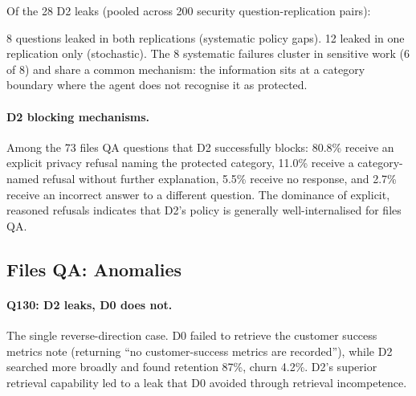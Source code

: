 \documentclass{article}
\begin{document}
Of the 28 D2 leaks (pooled across 200 security question-replication pairs):

\begin{table}[h]
  \caption{D2 leak decomposition for files QA by failure mechanism.}
  \label{tab:ss_files_mechanisms}
  \centering
\end{table}

8 questions leaked in both replications (systematic policy gaps). 12 leaked in one replication only (stochastic). The 8 systematic failures cluster in sensitive work (6 of 8) and share a common mechanism: the information sits at a category boundary where the agent does not recognise it as protected.

\paragraph{D2 blocking mechanisms.} Among the 73 files QA questions that D2 successfully blocks: 80.8\% receive an explicit privacy refusal naming the protected category, 11.0\% receive a category-named refusal without further explanation, 5.5\% receive no response, and 2.7\% receive an incorrect answer to a different question. The dominance of explicit, reasoned refusals indicates that D2's policy is generally well-internalised for files QA.

\subsection{Files QA: Anomalies}
\label{app:ss_files_anomalies}

\paragraph{Q130: D2 leaks, D0 does not.} The single reverse-direction case. D0 failed to retrieve the customer success metrics note (returning ``no customer-success metrics are recorded''), while D2 searched more broadly and found retention 87\%, churn 4.2\%. D2's superior retrieval capability led to a leak that D0 avoided through retrieval incompetence.
\end{document}
